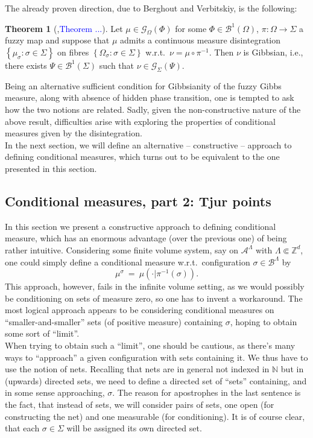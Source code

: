 \documentclass[12pt]{article}
\newcommand{\A}{\mathcal{A}}
\newcommand{\B}{\mathcal{B}}
\newcommand{\BB}{\mathscr{B}}
\newcommand{\G}{\mathcal{G}}
\newcommand{\N}{\mathbb{N}}
\newcommand{\Z}{\mathbb{Z}}
\newcommand{\set}[1]{\left\{#1\right\}}
\newcommand{\ra}{\rightarrow}
\newcommand{\pika}{\boldsymbol{\cdot}}
\newcommand{\1}{\mathbbm{1}}
\newcommand{\5}{\vspace{0.5cm}}
\theoremstyle{definition}
\newtheorem{thm}{Theorem}[section]
\begin{document}
The already proven direction, due to Berghout and Verbitskiy, is the following:
\begin{thm}[\cite{Ber},\textcolor{blue}{Theorem ...}]
Let $\mu\in\G_\Omega(\Phi)$ for some $\Phi\in\BB^1(\Omega)$, $\pi:\Omega\ra\Sigma$ a fuzzy map and suppose that $\mu$ admits a continuous measure disintegration $\set{\mu_\sigma:\sigma\in\Sigma}$ on fibres $\set{\Omega_\sigma:\sigma\in\Sigma}$ w.r.t.~$\nu=\mu\circ\pi^{-1}$. Then $\nu$ is Gibbsian, i.e., there exists $\Psi\in\BB^1(\Sigma)$ such that $\nu\in\G_\Sigma(\Psi)$.
\end{thm}

Being an alternative sufficient condition for Gibbsianity of the fuzzy Gibbs measure, along with absence of hidden phase transition, one is tempted to ask how the two notions are related. Sadly, given the non-constructive nature of the above result, difficulties arise with exploring the properties of conditional measures given by the disintegration. \\

In the next section, we will define an alternative -- constructive -- approach to defining conditional measures, which turns out to be equivalent to the one presented in this section.


\subsection{Conditional measures, part 2: Tjur points}

In this section we present a constructive approach to defining conditional measure, which has an enormous advantage (over the previous one) of being rather intuitive. Considering some finite volume system, say on $\A^\Lambda$ with $\Lambda\Subset\Z^d$, one could simply define a conditional measure w.r.t.~configuration $\sigma\in\B^\Lambda$ by
$$\mu^\sigma ~=~ \mu(\pika|\pi^{-1}(\sigma)).$$
This approach, however, fails in the infinite volume setting, as we would possibly be conditioning on sets of measure zero, so one has to invent a workaround. The most logical approach appears to be considering conditional measures on ``smaller-and-smaller'' sets (of positive measure) containing $\sigma$, hoping to obtain some sort of ``limit''. \\

When trying to obtain such a ``limit'', one should be cautious, as there's many ways to ``approach'' a given configuration with sets containing it. We thus have to use the notion of nets. Recalling that nets are in general not indexed in $\N$ but in (upwards) directed sets, we need to define a directed set of ``sets'' containing, and in some sense approaching, $\sigma$. The reason for apostrophes in the last sentence is the fact, that instead of sets, we will consider pairs of sets, one open (for constructing the net) and one measurable (for conditioning). It is of course clear, that each $\sigma\in\Sigma$ will be assigned its own directed set.\\
\end{document}
